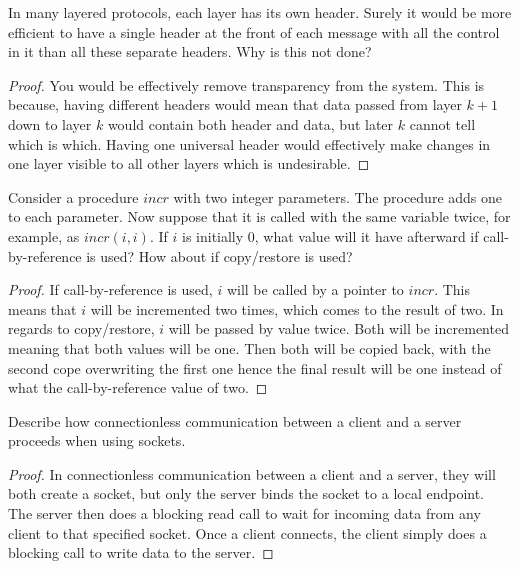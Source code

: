\documentclass[12pt]{article}
\newenvironment{exercise}[2][Exercise]{\begin{trivlist}
\item[\hskip \labelsep {\bfseries #1}\hskip \labelsep {\bfseries #2.}]}{\end{trivlist}}
\begin{document}
\begin{exercise}{6}
In many layered protocols, each layer has its own header. Surely it would be more efficient to have a single header at the front of each message with all the control in it than all these separate headers. Why is this not done?
\end{exercise}

\begin{proof}
You would be effectively remove transparency from the system. This is because, having different headers would mean that data passed from layer $k+1$ down to layer $k$ would contain both header and data, but later $k$ cannot tell which is which. Having one universal header would effectively make changes in one layer visible to all other layers which is undesirable.
\end{proof}

\begin{exercise}{7}
Consider a procedure $incr$ with two integer parameters. The procedure adds one to each parameter. Now suppose that it is called with the same variable twice, for example, as $incr(i, i)$. If $i$ is initially 0, what value will it have afterward if call-by-reference is used? How about if copy/restore is used?
\end{exercise}

\begin{proof}
If call-by-reference is used, $i$ will be called by a pointer to $incr$. This means that $i$ will be incremented two times, which comes to the result of two. In regards to copy/restore, $i$ will be passed by value twice. Both will be incremented meaning that both values will be one. Then both will be copied back, with the second cope overwriting the first one hence the final result will be one instead of what the call-by-reference value of two.  
\end{proof}

\begin{exercise}{8}
Describe how connectionless communication between a client and a server proceeds when using sockets.
\end{exercise}

\begin{proof}
In connectionless communication between a client and a server, they will both create a socket, but only the server binds the socket to a local endpoint. The server then does a blocking read call to wait for incoming data from any client to that specified socket. Once a client connects, the client simply does a blocking call to write data to the server.
\end{proof}
\end{document}
